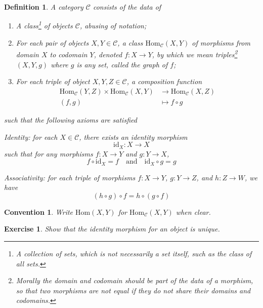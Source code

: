 \documentclass[10pt]{book}
\theoremstyle{bookplain}
\theoremstyle{bookdefinition}
\newtheorem{definition}[theorem]{Definition}
\newtheorem{exercise}[theorem]{Exercise}
\theoremstyle{bookremark}
\newtheorem{convention}[theorem]{Convention}
\begin{document}
\begin{definition}A \textit{category} $\mathscr{C}$ consists of the data of
\begin{enumerate}
	\item A class\footnote{A collection of sets, which is not necessarily a set itself, such as the class of all sets.} of \textit{objects} $\mathscr{C}$, abusing of notation;
	\item For each pair of objects $X,Y\in \mathscr{C}$, a class $\mathrm{Hom}_{\mathscr{C}}(X,Y)$ of \textit{morphisms} from \textit{domain} $X$ to \textit{codomain} $Y$, denoted $f:X\rightarrow Y$, by which we mean triples\footnote{Morally the domain and codomain should be part of the data of a morphism, so that two morphisms are not equal if they do not share their domains and codomains.} $(X,Y,g)$ where $g$ is any set, called the \textit{graph} of $f$;
	\item For each triple of object $X,Y,Z\in\mathscr{C}$, a \textit{composition} function 
	\[\begin{aligned}
        \mathrm{Hom}_{\mathscr{C}}(Y,Z)\times\mathrm{Hom}_{\mathscr{C}}(X,Y)&\rightarrow \mathrm{Hom}_{\mathscr{C}}(X,Z)\\
        (f,g)&\mapsto f\circ g
    \end{aligned}\]
\end{enumerate}
such that the following axioms are satisfied
\begin{axioms}
	\item\label{cat:identity} \textit{Identity}: for each $X\in\mathscr{C}$, there exists an \textit{identity morphism} $$\mathrm{id}_X:X\rightarrow X$$ such that for any morphisms  $f:X\rightarrow Y$ and $g:Y\rightarrow X$, \[f\circ \mathrm{id}_X=f\quad\mathrm{and}\quad\mathrm{id}_X\circ g=g\]
	\item\label{cat:associativity} \textit{Associativity}: for each triple of morphisms $f:X\rightarrow Y$, $g:Y\rightarrow Z$, and $h:Z\rightarrow W$, we have \[(h\circ g)\circ f=h\circ (g\circ f)\]
\end{axioms}
\end{definition}
\begin{convention}
    Write $\mathrm{Hom}(X,Y)$ for $\mathrm{Hom}_{\mathscr{C}}(X,Y)$ when clear. 
\end{convention}
\begin{exercise}Show that the identity morphism for an object is unique.
\end{exercise}
\end{document}
